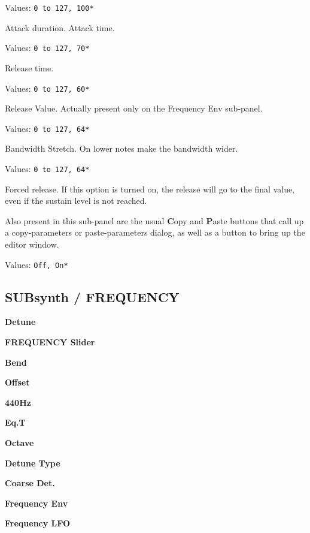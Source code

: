    Values: \texttt{0 to 127, 100*}

   Attack duration. Attack time.

   Values: \texttt{0 to 127, 70*}

   Release time.

   Values: \texttt{0 to 127, 60*}

   Release Value.
   Actually present only on the Frequency Env sub-panel.

   Values: \texttt{0 to 127, 64*}

   Bandwidth Stretch. On lower notes make the bandwidth wider.

   Values: \texttt{0 to 127, 64*}

   Forced release.
   If this option is turned on, the release will go to the final value, even if
   the sustain level is not reached.

   Also present in this sub-panel are the usual \textbf{C}opy and \textbf{P}aste
   buttons that call up a copy-parameters or paste-parameters dialog, as well as
   a button to bring up the editor window.

   Values: \texttt{Off, On*}

\subsection{SUBsynth / FREQUENCY}
\label{subsec:subsynth_frequency}

   \begin{enumber}
      \item \textbf{Detune}
      \item \textbf{FREQUENCY Slider}
      \item \textbf{Bend}
      \item \textbf{Offset}
      \item \textbf{440Hz}
      \item \textbf{Eq.T}
      \item \textbf{Octave}
      \item \textbf{Detune Type}
      \item \textbf{Coarse Det.}
      \item \textbf{Frequency Env}
      \item \textbf{Frequency LFO}
   \end{enumber}

